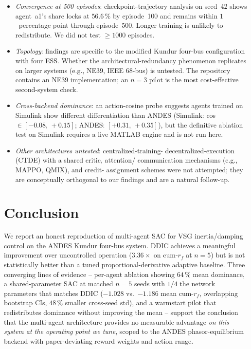\documentclass[journal,onecolumn,11pt]{IEEEtran}
\begin{document}
\begin{itemize}
  \item \emph{Convergence at 500 episodes}: checkpoint-trajectory
        analysis on seed~42 shows agent~a1's share locks at $56.6\,\%$
        by episode~100 and remains within $1$~percentage point through
        episode~500. Longer training is unlikely to redistribute. We
        did not test $\geq 1000$ episodes.
  \item \emph{Topology}: findings are specific to the modified Kundur
        four-bus configuration with four ESS. Whether the
        architectural-redundancy phenomenon replicates on larger
        systems (e.g., NE39, IEEE 68-bus) is untested. The repository
        contains an NE39 implementation; an $n = 3$ pilot is the
        most cost-effective second-system check.
  \item \emph{Cross-backend dominance}: an action-cosine probe
        suggests agents trained on Simulink show different
        differentiation than ANDES (Simulink: cos $\in [-0.08,\,+0.15]$;
        ANDES: $[+0.31,\,+0.35]$), but the definitive ablation test
        on Simulink requires a live MATLAB engine and is not run here.
  \item \emph{Other architectures untested}: centralized-training-
        decentralized-execution (CTDE) with a shared critic, attention/
        communication mechanisms (e.g., MAPPO, QMIX), and credit-
        assignment schemes were not attempted; they are conceptually
        orthogonal to our findings and are a natural follow-up.
\end{itemize}

\section{Conclusion}\label{sec:conclusion}

We report an honest reproduction of multi-agent SAC for VSG
inertia/damping control on the ANDES Kundur four-bus system. DDIC
achieves a meaningful improvement over uncontrolled operation
($3.36\times$ on cum-$r_f$ at $n = 5$) but is not statistically better
than a tuned proportional-derivative adaptive baseline. Three
converging lines of evidence -- per-agent ablation showing $64\,\%$
mean dominance, a shared-parameter SAC at matched $n = 5$ seeds with
$1/4$ the network parameters that matches DDIC ($-1.028$ vs.\ $-1.186$
mean cum-$r_f$, overlapping bootstrap CIs, $48\,\%$ smaller cross-seed
std), and a warmstart pilot that redistributes dominance without
improving the mean -- support the conclusion that the multi-agent
architecture provides no measurable advantage \emph{on this system at
the operating point we tune}, scoped to the ANDES phasor-equilibrium
backend with paper-deviating reward weights and action range.
\end{document}
